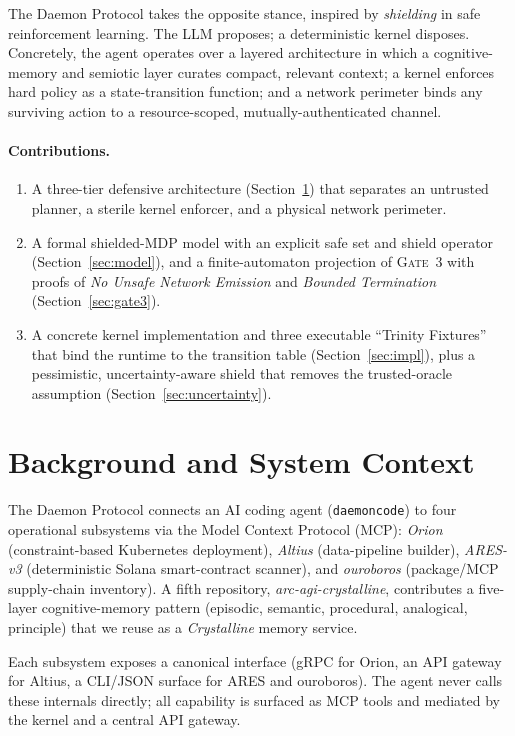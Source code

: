 \documentclass{article}
\theoremstyle{plain}
\theoremstyle{definition}
\begin{document}
The Daemon Protocol takes the opposite stance, inspired by \emph{shielding} in
safe reinforcement learning. The LLM proposes; a deterministic kernel disposes.
Concretely, the agent operates over a layered architecture in which a
cognitive-memory and semiotic layer curates compact, relevant context; a kernel
enforces hard policy as a state-transition function; and a network perimeter
binds any surviving action to a resource-scoped, mutually-authenticated channel.

\paragraph{Contributions.}
\begin{enumerate}
  \item A three-tier defensive architecture (Section~\ref{sec:arch}) that
  separates an untrusted planner, a sterile kernel enforcer, and a physical
  network perimeter.
  \item A formal shielded-MDP model with an explicit safe set and shield
  operator (Section~\ref{sec:model}), and a finite-automaton projection of
  \textsc{Gate~3} with proofs of \emph{No Unsafe Network Emission} and
  \emph{Bounded Termination} (Section~\ref{sec:gate3}).
  \item A concrete kernel implementation and three executable ``Trinity
  Fixtures'' that bind the runtime to the transition table
  (Section~\ref{sec:impl}), plus a pessimistic, uncertainty-aware shield that
  removes the trusted-oracle assumption (Section~\ref{sec:uncertainty}).
\end{enumerate}

\section{Background and System Context}
\label{sec:arch}
The Daemon Protocol connects an AI coding agent (\texttt{daemoncode}) to four
operational subsystems via the Model Context Protocol (MCP): \emph{Orion}
(constraint-based Kubernetes deployment), \emph{Altius} (data-pipeline builder),
\emph{ARES-v3} (deterministic Solana smart-contract scanner), and
\emph{ouroboros} (package/MCP supply-chain inventory). A fifth repository,
\emph{arc-agi-crystalline}, contributes a five-layer cognitive-memory pattern
(episodic, semantic, procedural, analogical, principle) that we reuse as a
\emph{Crystalline} memory service.

Each subsystem exposes a canonical interface (gRPC for Orion, an API gateway for
Altius, a CLI/JSON surface for ARES and ouroboros). The agent never calls these
internals directly; all capability is surfaced as MCP tools and mediated by the
kernel and a central API gateway.
\end{document}
